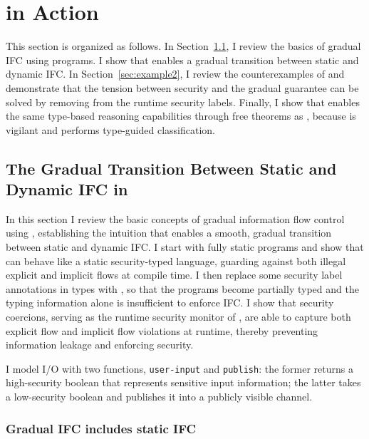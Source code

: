 \section{\Surface in Action}
\label{sec:examples}

This section is organized as follows. In Section~\ref{sec:example1}, I review
the basics of gradual IFC using \Surface programs. I show that \Surface enables
a gradual transition between static and dynamic IFC. In
Section~\ref{sec:example2}, I review the counterexamples of
\textcite{Toro:2018aa} and demonstrate that the tension between security and the
gradual guarantee can be solved by removing \unk from the runtime security
labels. Finally, I show that \Surface enables the same type-based reasoning
capabilities through free theorems as \GSLRef, because \Surface is vigilant and
performs type-guided classification.

\subsection{The Gradual Transition Between Static and Dynamic IFC in \Surface}
\label{sec:example1}

In this section I review the basic concepts of gradual information flow control
using \Surface, establishing the intuition that \Surface enables a smooth,
gradual transition between static and dynamic IFC. I start with fully static
\Surface programs and show that \Surface can behave like a static security-typed
language, guarding against both illegal explicit and implicit flows at compile
time. I then replace some security label annotations in types with \unk, so that
the programs become partially typed and the typing information alone is
insufficient to enforce IFC. I show that security coercions, serving as the
runtime security monitor of \Surface, are able to capture both explicit flow and
implicit flow violations at runtime, thereby preventing information leakage and
enforcing security.

I model I/O with two functions, \texttt{user-input} and \texttt{publish}: the
former returns a high-security boolean that represents sensitive input
information; the latter takes a low-security boolean and publishes it into a
publicly visible channel.

\subsubsection{Gradual IFC includes static IFC}

